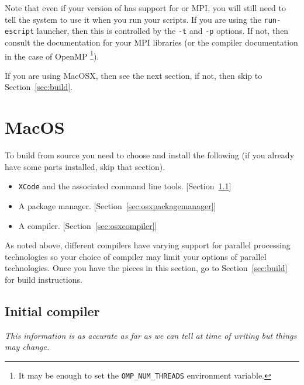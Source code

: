 Note that even if your version of \escript has support for \openmp or MPI, you will still need to tell the system to 
use it when you run your scripts.
If you are using the \texttt{run-escript} launcher, then this is controlled  by the \texttt{-t} and \texttt{-p} options.
If not, then consult the documentation for your MPI libraries (or the compiler documentation in the case of OpenMP
\footnote{It may be enough to set the \texttt{OMP\_NUM\_THREADS} environment variable.}).

If you are using MacOSX, then see the next section, if not, then skip to Section~\ref{sec:build}.

\section{MacOS}

To build \escript from source you need to choose and install the following (if you already have some parts installed, skip 
that section).
\begin{itemize}
 \item \texttt{XCode} and the associated command line tools. [Section~\ref{sec:initcompiler}]
 \item A package manager. [Section~\ref{sec:osxpackagemanager}]
 \item A compiler. [Section~\ref{sec:osxcompiler}] 
\end{itemize}

As noted above, different compilers have varying support for parallel processing technologies so your choice of 
compiler may limit your options of parallel technologies.
Once you have the pieces in this section, go to Section~\ref{sec:build} for build instructions.

\subsection{Initial compiler}\label{sec:initcompiler}
\emph{This information is as accurate as far as we can tell at time of writing but things may change.}

